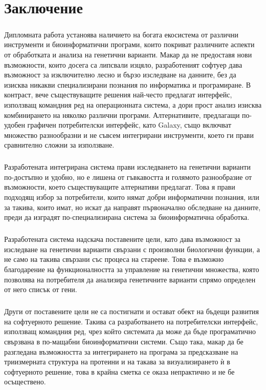 \documentclass[pdftex,cyrillic,14pt,a4page,twoside,openright]{extreport}
\begin{document}
\chapter{Заключение}
\paragraph{}
Дипломната работа устаноява наличието на богата екосистема от различни инструменти и биоинформатични програми, които покриват различните аспекти от обработката и анализа на генетични варианти. Макар да не предоставя нови възможности, които досега са липсвали изцяло, разработеният софтуер дава възможност за изключително лесно и бързо изследване на данните, без да изисква никакви специализирани познания по информатика и програмиране. В контраст, вече съществуващите решения най-често предлагат интерфейс, използващ командния ред на операционната система, а дори прост анализ изисква комбинирането на няколко различни програми. Алтернативите, предлагащи по-удобен графичен потребителски интерфейс, като Galaxy, също включват множество разнообразни и не съвсем интегрирани инструменти, което ги прави сравнително сложни за използване.

\paragraph{}
Разработената интегрирана система прави изследването на генетични варианти по-достъпно и удобно, но е лишена от гъвкавостта и голямото разнообразие от възможности, което съществуващите алтернативи предлагат. Това я прави подходящ избор за потребители, които нямат добри информатични познания, или за такива, които имат, но искат да направят първоначално обследване на данните, преди да изградят по-специализирана система за биоинформатична обработка.

\paragraph{}
Разработената система надскача поставените цели, като дава възможност за изследване на генетични варианти свързани с произволни биологични функции, а не само на такива свързани със процеса на стареене. Това е възможно благодарение на функционалността за управление на генетични множества, която позволява на потребителя да анализира генетичните варианти спрямо определен от него списък от гени.

\paragraph{}
Други от поставените цели не са постигнати и остават обект на бъдещи развития на софтуерното решение. Такива са разработването на потребителски интерфейс, използващ командния ред, чрез който системата да може да бъде програматично свързвана в по-мащабни биоинформатични системи. Също така, макар да бе разгледана възможността за интегрирането на програма за предсказване на триизмерната структура на протеини и на такава за визуализирането ѝ в софтуерното решение, това в крайна сметка се оказа непрактично и не бе осъществено.
\end{document}
